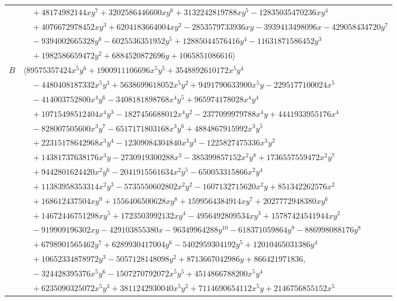 \documentclass[11pt]{article}
\begin{document}
\begin{longtable}{@{}ll@{}}
 & $\quad +48174982144xy^{7}+3202586446600xy^{6}+3132242819788xy^{5}-12835035470236xy^{4}$\\
 & $\quad +4076672978452xy^{3}+6204183664004xy^{2}-2853579733936xy-3939413498096x-429058434720y^{7}$\\
 & $\quad -9394002665328y^{6}-6025536351952y^{5}+12885044576416y^{4}-11631871586452y^{3}$\\
 & $\quad +1982586659472y^{2}+6884520872696y+1065851086616\rangle$\\
$B$ & $\langle 89575357424x^{5}y^{6}+1900911106696x^{5}y^{5}+3548892610172x^{5}y^{4}$\\
 & $\quad -4480408187332x^{5}y^{3}+5638699618052x^{5}y^{2}+9491790633900x^{5}y-2295177100024x^{5}$\\
 & $\quad -414003752800x^{4}y^{6}-3408181898768x^{4}y^{5}+965974178028x^{4}y^{4}$\\
 & $\quad +10715498512404x^{4}y^{3}-1827456688012x^{4}y^{2}-2377099979788x^{4}y+4441933955176x^{4}$\\
 & $\quad -828007505600x^{3}y^{7}-6517171803168x^{3}y^{6}+4884867915992x^{3}y^{5}$\\
 & $\quad +22315178642968x^{3}y^{4}-12309084304840x^{3}y^{3}-1225827475336x^{3}y^{2}$\\
 & $\quad +14381737638176x^{3}y-2730919300288x^{3}-385399857152x^{2}y^{8}+1736557559472x^{2}y^{7}$\\
 & $\quad +9442801624420x^{2}y^{6}-2041915561634x^{2}y^{5}-650053315866x^{2}y^{4}$\\
 & $\quad +11383958353314x^{2}y^{3}-5735550602802x^{2}y^{2}-1607132715620x^{2}y+851342262576x^{2}$\\
 & $\quad +168612437504xy^{9}+1556406500628xy^{8}+1599564384914xy^{7}+2027772948380xy^{6}$\\
 & $\quad +14672446751298xy^{5}+1723503992132xy^{4}-4956492809534xy^{3}+15787424541944xy^{2}$\\
 & $\quad -919909196302xy-429103855380x-96349964288y^{10}-618371059864y^{9}-886998088176y^{8}$\\
 & $\quad +6798901565462y^{7}+6289930417004y^{6}-5402959304192y^{5}+12010465031386y^{4}$\\
 & $\quad +10652334878972y^{3}-5057128148098y^{2}+8713667042986y+866421971836,$\\
 & $\quad -324428395376x^{5}y^{6}-1507270792072x^{5}y^{5}+4514866788200x^{5}y^{4}$\\
 & $\quad +6235090325072x^{5}y^{3}+3811242930040x^{5}y^{2}+7114690654112x^{5}y+2146756855152x^{5}$\\

\end{longtable}
\end{document}
